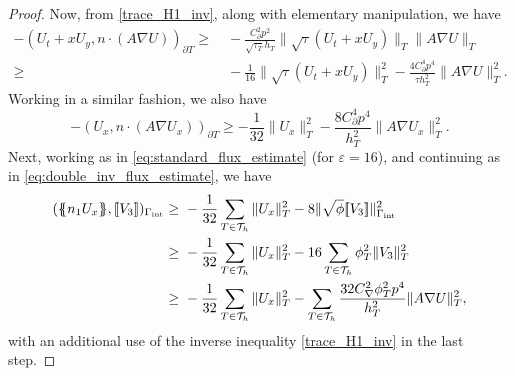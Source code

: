 \documentclass{amsart}
\newcommand{\norm}[2]{\|{#1}\|_{{#2}}}
\newcommand{\jump}[1]{[\kern-0.6mm [{#1}]\kern-0.6mm]}
\newcommand{\av}[1]{\{\kern-1.2mm \{{#1}\}\kern-1.2mm\}}
\newcommand{\su}{\sum_{T \in \Th}}
\newcommand{\inner}[3]{({#1},{#2})_{{#3}}}
\newcommand{\Th}{\mathcal{T}_h}
\newcommand{\gint}{\Gamma_{\rm int}}
\newcommand{\cinvT}{C_{\partial}}
\newcommand{\cinv}{C_{\nabla}}
\newcommand{\normal}{{n}}
\newcommand{\avg }[1]{ \av{ #1}}
\theoremstyle{definition}
\theoremstyle{remark}
\numberwithin{equation}{section}
\begin{document}
\begin{proof}
Now, from \eqref{trace_H1_inv}, along with elementary manipulation, we have
	\begin{equation*}\begin{split}
		-	   \inner{U_t+ x U_y}{\normal \cdot (A\nabla U)}{\partial T}
			\geq&\
		-	\frac{\cinvT ^2	p^2}{\sqrt{\tau_T}h_T} \norm{ \sqrt{\tau} (U_t+ x U_y)}{T}
	 \norm{A \nabla U}{ T}
			\\
			\geq &\
		-			\frac{1}{16}	\norm{ \sqrt{\tau} (U_t+ x U_y)}{T}^2 -  \frac{4\cinvT^4p^4}{\tau h_T^2}
			\norm{A \nabla U}{T}^2.
	\end{split}\end{equation*}
Working in a similar fashion, we also have
	\begin{equation*}
		-	\inner{U_x}{\normal \cdot (A\nabla U_x)}{\partial T}
			\geq
		-	\frac{1}{32}     \norm{U_x}{T}^2 -  \frac{ 8\cinvT^4p^4}{h_T^2}\norm{A\nabla U_x}{T}^2.
\end{equation*}
Next, working as in \eqref{eq:standard_flux_estimate} (for $\varepsilon=16$), and continuing as in \eqref{eq:double_inv_flux_estimate}, we have
	\begin{equation*}\begin{split}
			   \inner{\avg{\normal_1 U_x}}{\jump{V_3 }}{\gint}
			   \geq&\ - \frac{1}{32}  \su \norm{ U_x}{ T}^2 -  8\norm{\sqrt{\phi} \jump{V_3}}{\gint}^2\\
	   \geq&\ - \frac{1}{32}  \su \norm{ U_x}{ T}^2 -  16\su\phi_T^2\norm{V_3}{T}^2\\
	   \geq&\ - \frac{1}{32}  \su \norm{ U_x}{ T}^2 -  \su\frac{32\cinv^2\phi_T^2 p^4}{h_T^2}\norm{A\nabla U}{T}^2,
	\end{split}\end{equation*}
with an additional use of the inverse inequality \eqref{trace_H1_inv} in the last step.



\end{proof}
\end{document}
